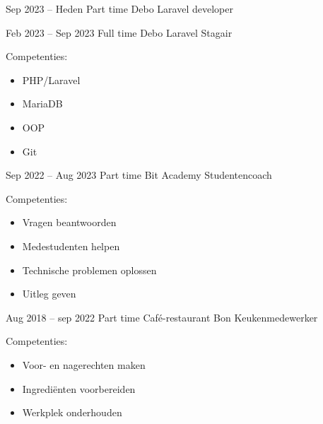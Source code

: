 \documentclass[
	11pt, %
]{FreemanCV}
\begin{document}
\begin{paracol}{2}
	\jobentry
	{Sep 2023 -- Heden} %
	{Part time} %
	{Debo} %
	{Laravel developer} %
	{} %

	\jobentry
	{Feb 2023 -- Sep 2023} %
	{Full time} %
	{Debo} %
	{Laravel Stagair} %
	{Competenties:
				\begin{itemize}
					\item PHP/Laravel
					\item MariaDB
					\item OOP
					\item Git
				\end{itemize}
			} %

	\jobentry
	{Sep 2022 -- Aug 2023} %
	{Part time} %
	{Bit Academy} %
	{Studentencoach} %
	{Competenties:
		\begin{itemize}
			\item Vragen beantwoorden
			\item Medestudenten helpen
			\item Technische problemen oplossen
			\item Uitleg geven
		\end{itemize}
	} %

	\jobentry
	{Aug 2018 -- sep 2022} %
	{Part time} %
	{Café-restaurant Bon} %
	{Keukenmedewerker} %
	{Competenties:
		\begin{itemize}
			\item Voor- en nagerechten maken
			\item Ingrediënten voorbereiden
			\item Werkplek onderhouden
		\end{itemize}
	} %




\end{paracol}
\end{document}
